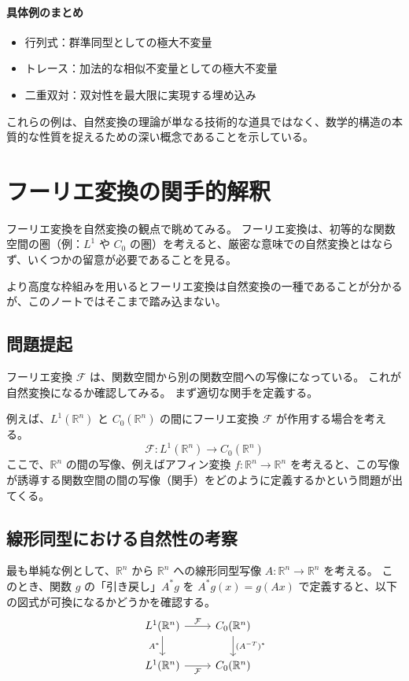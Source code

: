 \documentclass[uplatex,a4j,12pt,dvipdfmx]{jsarticle}
\begin{document}
\paragraph{具体例のまとめ}
\begin{itemize}
	\item 行列式：群準同型としての極大不変量
	\item トレース：加法的な相似不変量としての極大不変量
	\item 二重双対：双対性を最大限に実現する埋め込み
\end{itemize}

これらの例は、自然変換の理論が単なる技術的な道具ではなく、数学的構造の本質的な性質を捉えるための深い概念であることを示している。



\section{フーリエ変換の関手的解釈}

フーリエ変換を自然変換の観点で眺めてみる。
フーリエ変換は、初等的な関数空間の圏（例：$L^{1}$ や $C_{0}$ の圏）を考えると、厳密な意味での自然変換とはならず、いくつかの留意が必要であることを見る。

より高度な枠組みを用いるとフーリエ変換は自然変換の一種であることが分かるが、このノートではそこまで踏み込まない。

\subsection{問題提起}

フーリエ変換 $\mathcal{F}$ は、関数空間から別の関数空間への写像になっている。
これが自然変換になるか確認してみる。
まず適切な関手を定義する。

例えば、$L^1(\mathbb{R}^n)$ と $C_0(\mathbb{R}^n)$ の間にフーリエ変換 $\mathcal{F}$ が作用する場合を考える。
\[
	\mathcal{F}: L^1(\mathbb{R}^n) \to C_0(\mathbb{R}^n)
\]
ここで、$\mathbb{R}^n$ の間の写像、例えばアフィン変換 $f: \mathbb{R}^n \to \mathbb{R}^n$ を考えると、この写像が誘導する関数空間の間の写像（関手）をどのように定義するかという問題が出てくる。

\subsection{線形同型における自然性の考察}

最も単純な例として、$\mathbb{R}^n$ から $\mathbb{R}^n$ への線形同型写像 $A: \mathbb{R}^n \to \mathbb{R}^n$ を考える。
このとき、関数 $g$ の「引き戻し」$A^*g$ を $A^*g(x) = g(Ax)$ で定義すると、以下の図式が可換になるかどうかを確認する。
\[
	\begin{tikzcd}
		L^1(\mathbb{R}^n) \arrow[r, "\mathcal{F}"] \arrow[d, "A^*"'] & C_0(\mathbb{R}^n) \arrow[d, "(A^{-T})^*"] \\
		L^1(\mathbb{R}^n) \arrow[r, "\mathcal{F}"'] & C_0(\mathbb{R}^n)
	\end{tikzcd}
\]
\end{document}
